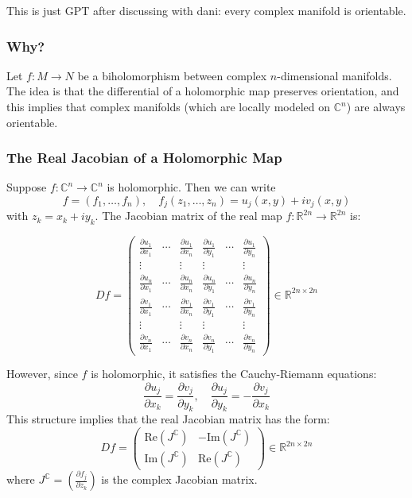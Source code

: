 This is just GPT after discussing with dani: every complex manifold is orientable.

\subsubsection*{Why?}

Let \( f: M \to N \) be a biholomorphism between complex \(n\)-dimensional manifolds. The idea is that the differential of a holomorphic map preserves orientation, and this implies that complex manifolds (which are locally modeled on \(\mathbb{C}^n\)) are always orientable.

\subsubsection*{The Real Jacobian of a Holomorphic Map}

Suppose \( f: \mathbb{C}^n \to \mathbb{C}^n \) is holomorphic. Then we can write
\[
f = (f_1, \dots, f_n), \quad f_j(z_1, \dots, z_n) = u_j(x, y) + i v_j(x, y)
\]
with \( z_k = x_k + i y_k \). The Jacobian matrix of the real map \( f: \mathbb{R}^{2n} \to \mathbb{R}^{2n} \) is:

\[
Df =
\begin{pmatrix}
\frac{\partial u_1}{\partial x_1} & \cdots & \frac{\partial u_1}{\partial x_n} & \frac{\partial u_1}{\partial y_1} & \cdots & \frac{\partial u_1}{\partial y_n} \\
\vdots & & \vdots & \vdots & & \vdots \\
\frac{\partial u_n}{\partial x_1} & \cdots & \frac{\partial u_n}{\partial x_n} & \frac{\partial u_n}{\partial y_1} & \cdots & \frac{\partial u_n}{\partial y_n} \\
\frac{\partial v_1}{\partial x_1} & \cdots & \frac{\partial v_1}{\partial x_n} & \frac{\partial v_1}{\partial y_1} & \cdots & \frac{\partial v_1}{\partial y_n} \\
\vdots & & \vdots & \vdots & & \vdots \\
\frac{\partial v_n}{\partial x_1} & \cdots & \frac{\partial v_n}{\partial x_n} & \frac{\partial v_n}{\partial y_1} & \cdots & \frac{\partial v_n}{\partial y_n}
\end{pmatrix}
\in \mathbb{R}^{2n \times 2n}
\]

However, since \(f\) is holomorphic, it satisfies the Cauchy-Riemann equations:
\[
\frac{\partial u_j}{\partial x_k} = \frac{\partial v_j}{\partial y_k}, \quad
\frac{\partial u_j}{\partial y_k} = -\frac{\partial v_j}{\partial x_k}
\]
This structure implies that the real Jacobian matrix has the form:
\[
Df = 
\begin{pmatrix}
\mathrm{Re}(J^{\mathbb{C}}) & -\mathrm{Im}(J^{\mathbb{C}}) \\
\mathrm{Im}(J^{\mathbb{C}}) & \mathrm{Re}(J^{\mathbb{C}})
\end{pmatrix}
\in \mathbb{R}^{2n \times 2n}
\]
where \( J^{\mathbb{C}} = \left( \frac{\partial f_j}{\partial z_k} \right) \) is the complex Jacobian matrix.

